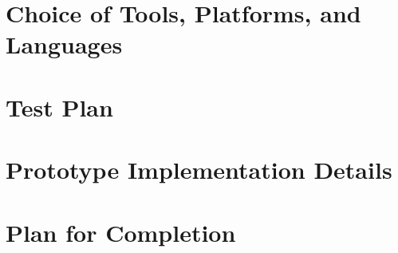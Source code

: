 \documentclass{scrreprt}
\begin{document}
\chapter {Choice of Tools, Platforms, and Languages}




\chapter{Test Plan}




\chapter{Prototype Implementation Details}




\chapter{Plan for Completion}
\end{document}
